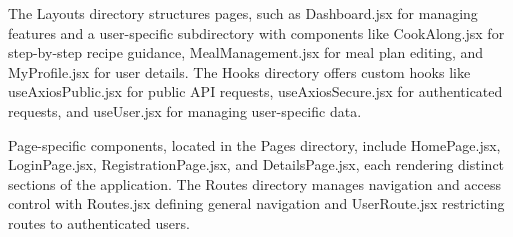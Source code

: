 \documentclass[10pt,twocolumn]{article}
\begin{document}
The Layouts directory structures pages, such as Dashboard.jsx for managing features and a user-specific subdirectory with components like CookAlong.jsx for step-by-step recipe guidance, MealManagement.jsx for meal plan editing, and MyProfile.jsx for user details. The Hooks directory offers custom hooks like useAxiosPublic.jsx for public API requests, useAxiosSecure.jsx for authenticated requests, and useUser.jsx for managing user-specific data.

Page-specific components, located in the Pages directory, include HomePage.jsx, LoginPage.jsx, RegistrationPage.jsx, and DetailsPage.jsx, each rendering distinct sections of the application. The Routes directory manages navigation and access control with Routes.jsx defining general navigation and UserRoute.jsx restricting routes to authenticated users.

\printbibliography
\end{document}
